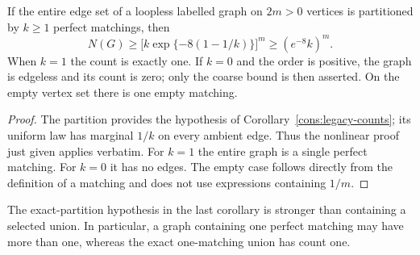 \begin{corollary}\label{cons:legacy-partition}
If the entire edge set of a loopless labelled graph on $2m>0$ vertices
is partitioned by $k\ge1$ perfect matchings, then
\[
 N(G)\ge\bigl[k\exp\{-8(1-1/k)\}\bigr]^m\ge(e^{-8}k)^m.
\]
When $k=1$ the count is exactly one. If $k=0$ and the order is positive,
the graph is edgeless and its count is zero; only the coarse bound is
then asserted. On the empty vertex set there is one empty matching.
\end{corollary}
\begin{proof}
The partition provides the hypothesis of Corollary~\ref{cons:legacy-counts};
its uniform law has marginal $1/k$ on every ambient edge. Thus the
nonlinear proof just given applies verbatim. For $k=1$ the entire graph
is a single perfect matching. For $k=0$ it has no edges. The empty case
follows directly from the definition of a matching and does not use
expressions containing $1/m$.
\end{proof}

The exact-partition hypothesis in the last corollary is stronger than
containing a selected union. In particular, a graph containing one
perfect matching may have more than one, whereas the exact one-matching
union has count one.
